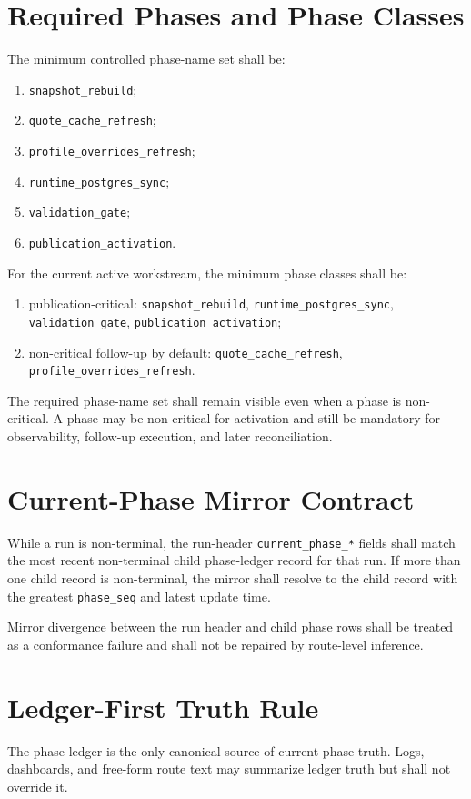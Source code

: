 \documentclass[11pt]{report}
\begin{document}
\section{Required Phases and Phase Classes}
The minimum controlled phase-name set shall be:
\begin{enumerate}[leftmargin=1.2cm]
    \item \texttt{snapshot\_rebuild};
    \item \texttt{quote\_cache\_refresh};
    \item \texttt{profile\_overrides\_refresh};
    \item \texttt{runtime\_postgres\_sync};
    \item \texttt{validation\_gate};
    \item \texttt{publication\_activation}.
\end{enumerate}

For the current active workstream, the minimum phase classes shall be:
\begin{enumerate}[leftmargin=1.2cm]
    \item publication-critical: \texttt{snapshot\_rebuild}, \texttt{runtime\_postgres\_sync}, \texttt{validation\_gate}, \texttt{publication\_activation};
    \item non-critical follow-up by default: \texttt{quote\_cache\_refresh}, \texttt{profile\_overrides\_refresh}.
\end{enumerate}

The required phase-name set shall remain visible even when a phase is non-critical. A phase may be non-critical for activation and still be mandatory for observability, follow-up execution, and later reconciliation.

\section{Current-Phase Mirror Contract}
While a run is non-terminal, the run-header \texttt{current\_phase\_*} fields shall match the most recent non-terminal child phase-ledger record for that run. If more than one child record is non-terminal, the mirror shall resolve to the child record with the greatest \texttt{phase\_seq} and latest update time.

Mirror divergence between the run header and child phase rows shall be treated as a conformance failure and shall not be repaired by route-level inference.

\section{Ledger-First Truth Rule}
The phase ledger is the only canonical source of current-phase truth. Logs, dashboards, and free-form route text may summarize ledger truth but shall not override it.
\end{document}
